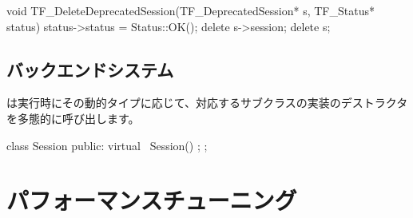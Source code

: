 \begin{content}
\begin{leftbar}
\begin{c++}[caption={tensorflow/c/c\_api.c}]
void TF_DeleteDeprecatedSession(TF_DeprecatedSession* s, TF_Status* status) {
  status->status = Status::OK();
  delete s->session;
  delete s;
}
\end{c++}
\end{leftbar}

\subsection{バックエンドシステム}

は実行時にその動的タイプに応じて、対応するサブクラスの実装のデストラクタを多態的に呼び出します。

\begin{leftbar}
\begin{c++}[caption={tensorflow/core/common\_runtime/session.h}]
class Session {
public:
  virtual ~Session() {};
};
\end{c++}
\end{leftbar}

\end{content}

\section{パフォーマンスチューニング}

